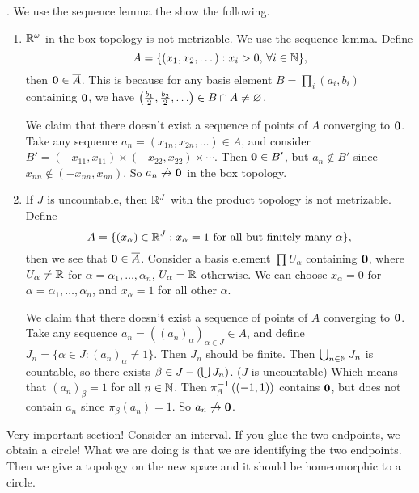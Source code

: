 \ex. We use the sequence lemma the show the following.
\begin{enumerate}
    \item \(\R^\omega\) in the box topology is not metrizable. We use the sequence lemma. Define
          \[
              A = \{(x_1, x_2, \dots) : x_i > 0, \,\forall i \in \N\},
          \]
          then \(\bf{0} \in \cl{A}\). This is because for any basis element \(B = \prod_{i} (a_i, b_i)\) containing \(\bf{0}\), we have \(\paren{\frac{b_1}{2}, \frac{b_2}{2}, \dots} \in B \cap A \neq \varnothing\).

          We claim that there doesn't exist a sequence of points of \(A\) converging to \(\bf{0}\). Take any sequence \(a_n = (x_{1n}, x_{2n}, \dots) \in A\), and consider \(B' = (-x_{11}, x_{11}) \times (-x_{22}, x_{22}) \times \cdots\). Then \(\bf{0} \in B'\), but \(a_n \notin B'\) since \(x_{nn} \notin (-x_{nn}, x_{nn})\). So \(a_n \not\ra \bf{0}\) in the box topology.

    \item If \(J\) is uncountable, then \(\R^J\) with the product topology is not metrizable. Define
          \[
              A = \{(x_\alpha) \in \R^J : x_\alpha = 1 \text{ for all but finitely many } \alpha\},
          \]
          then we see that \(\bf{0} \in \cl{A}\). Consider a basis element \(\prod U_\alpha\) containing \(\bf{0}\), where \(U_\alpha \neq \R\) for \(\alpha = \alpha_1, \dots, \alpha_n\), \(U_\alpha = \R\) otherwise. We can choose \(x_\alpha = 0\) for \(\alpha = \alpha_1, \dots, \alpha_n\), and \(x_\alpha = 1\) for all other \(\alpha\).

          We claim that there doesn't exist a sequence of points of \(A\) converging to \(\bf{0}\). Take any sequence \(a_n = ((a_n)_\alpha)_{\alpha \in J} \in A\), and define \(J_n = \{\alpha \in J : (a_n)_\alpha \neq 1\}\). Then \(J_n\) should be finite. Then \(\bigcup_{n \in \N} J_n\) is countable, so there exists \(\beta \in J \bs \paren{\bigcup J_n}\). (\(J\) is uncountable) Which means that \((a_n)_\beta = 1\) for all \(n \in \N\). Then \(\pi_\beta\inv\paren{(-1, 1)}\) contains \(\bf{0}\), but does not contain \(a_n\) since \(\pi_\beta(a_n) = 1\). So \(a_n \not\ra \bf{0}\).
\end{enumerate}


Very important section! Consider an interval. If you glue the two endpoints, we obtain a circle! What we are doing is that we are identifying the two endpoints. Then we give a topology on the new space and it should be homeomorphic to a circle.

